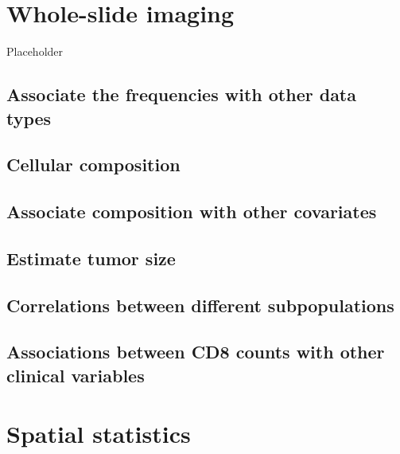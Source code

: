 \documentclass[
]{book}
\begin{document}
\hypertarget{whole-slide-imaging}{%
\chapter{Whole-slide imaging}\label{whole-slide-imaging}}

Placeholder

\hypertarget{associate-the-frequencies-with-other-data-types}{%
\section{Associate the frequencies with other data types}\label{associate-the-frequencies-with-other-data-types}}

\hypertarget{cellular-composition}{%
\section{Cellular composition}\label{cellular-composition}}

\hypertarget{associate-composition-with-other-covariates}{%
\section{Associate composition with other covariates}\label{associate-composition-with-other-covariates}}

\hypertarget{estimate-tumor-size}{%
\section{Estimate tumor size}\label{estimate-tumor-size}}

\hypertarget{correlations-between-different-subpopulations}{%
\section{Correlations between different subpopulations}\label{correlations-between-different-subpopulations}}

\hypertarget{associations-between-cd8-counts-with-other-clinical-variables}{%
\section{Associations between CD8 counts with other clinical variables}\label{associations-between-cd8-counts-with-other-clinical-variables}}

\hypertarget{spatial-statistics}{%
\chapter{Spatial statistics}\label{spatial-statistics}}
\end{document}
